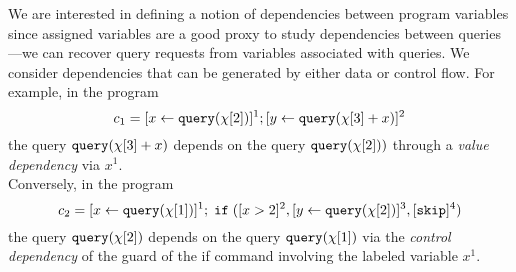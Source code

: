 %
We are interested in defining a notion of dependencies between program variables since assigned variables are a good proxy to study dependencies between queries---we can recover query requests from variables associated with queries. We consider dependencies that can be generated by either data or control flow.
For example, in the program 
\[c_1 =[\mathrel{ x \leftarrow {\tt query}(\chi[2]) }]^1 ;[\mathrel{ y \leftarrow {\tt query}(\chi[3] + x) }]^2\]
the query ${\tt query}(\chi[3] + x)$  depends on the query ${\tt query}(\chi[2]))$ through a \emph{value dependency} via  $x^1$.
\\
Conversely, in the program
\[c_2 = [\mathrel{ x \leftarrow {\tt query}(\chi[1]) }]^1 ; \;\mathtt{if}\;( [x > 2]^2 , [\mathrel{ y \leftarrow {\tt query}(\chi[2]) }]^3, [\mathtt{skip}]^4 )\] 
the query ${\tt query}(\chi[2])$  depends on the query ${\tt query}(\chi[1])$ via the \emph{control dependency} of the guard of the if command involving the labeled variable $x^1$.

